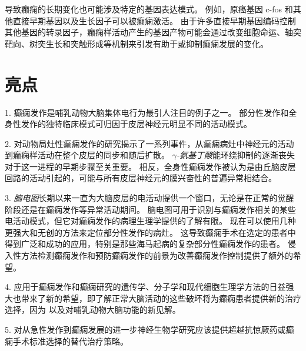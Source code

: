 导致癫痫的长期变化也可能涉及特定的基因表达模式。
例如，原癌基因 c-fos 和其他直接早期基因以及生长因子可以被癫痫激活。
由于许多直接早期基因编码控制其他基因的转录因子，癫痫样活动产生的基因产物可能会通过改变细胞命运、轴突靶向、树突生长和突触形成等机制来引发有助于或抑制癫痫发展的变化。



\section{亮点}

1. 癫痫发作是哺乳动物大脑集体电行为最引人注目的例子之一。
部分性发作和全身性发作的独特临床模式可归因于皮层神经元明显不同的活动模式。


2. 对动物局灶性癫痫发作的研究揭示了一系列事件，从癫痫病灶中神经元的活动到癫痫样活动在整个皮层的同步和随后扩散。
\textit{$\gamma$-氨基丁酸}能环绕抑制的逐渐丧失对于这一进程的早期步骤至关重要。
相反，全身性癫痫发作被认为是由丘脑皮层回路的活动引起的，可能与所有皮层神经元的膜兴奋性的普遍异常相结合。


3. \textit{脑电图}长期以来一直为大脑皮层的电活动提供一个窗口，无论是在正常的觉醒阶段还是在癫痫发作等异常活动期间。
脑电图可用于识别与癫痫发作相关的某些电活动模式，但它对癫痫发作的病理生理学提供的了解有限。
现在可以使用几种更强大和无创的方法来定位部分性发作的病灶。
这导致癫痫手术在选定的患者中得到广泛和成功的应用，特别是那些海马起病的复杂部分性癫痫发作的患者。
侵入性方法检测癫痫发作和预防癫痫发作的前景为改善癫痫发作控制提供了额外的希望。


4. 应用于癫痫发作和癫痫研究的遗传学、分子学和现代细胞生理学方法的日益强大也带来了新的希望，即了解正常大脑活动的这些破坏将为癫痫患者提供新的治疗选择，因为 以及对哺乳动物大脑功能的新见解。


5. 对从急性发作到癫痫发展的进一步神经生物学研究应该提供超越抗惊厥药或癫痫手术标准选择的替代治疗策略。

